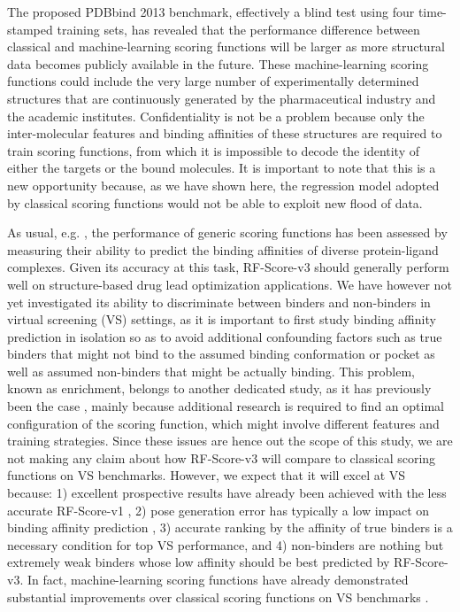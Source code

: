 The proposed PDBbind 2013 benchmark, effectively a blind test using four time-stamped training sets, has revealed that the performance difference between classical and machine-learning scoring functions will be larger as more structural data becomes publicly available in the future. These machine-learning scoring functions could include the very large number of experimentally determined structures that are continuously generated by the pharmaceutical industry and the academic institutes. Confidentiality is not be a problem because only the inter-molecular features and binding affinities of these structures are required to train scoring functions, from which it is impossible to decode the identity of either the targets or the bound molecules. It is important to note that this is a new opportunity because, as we have shown here, the regression model adopted by classical scoring functions would not be able to exploit new flood of data.

As usual, e.g. \citep{1313}, the performance of generic scoring functions has been assessed by measuring their ability to predict the binding affinities of diverse protein-ligand complexes. Given its accuracy at this task, RF-Score-v3 should generally perform well on structure-based drug lead optimization applications. We have however not yet investigated its ability to discriminate between binders and non-binders in virtual screening (VS) settings, as it is important to first study binding affinity prediction in isolation so as to avoid additional confounding factors such as true binders that might not bind to the assumed binding conformation or pocket as well as assumed non-binders that might be actually binding. This problem, known as enrichment, belongs to another dedicated study, as it has previously been the case \citep{977,1477}, mainly because additional research is required to find an optimal configuration of the scoring function, which might involve different features and training strategies. Since these issues are hence out the scope of this study, we are not making any claim about how RF-Score-v3 will compare to classical scoring functions on VS benchmarks. However, we expect that it will excel at VS because: 1) excellent prospective results have already been achieved with the less accurate RF-Score-v1 \citep{1281}, 2) pose generation error has typically a low impact on binding affinity prediction \citep{1362}, 3) accurate ranking by the affinity of true binders is a necessary condition for top VS performance, and 4) non-binders are nothing but extremely weak binders whose low affinity should be best predicted by RF-Score-v3. In fact, machine-learning scoring functions have already demonstrated substantial improvements over classical scoring functions on VS benchmarks \citep{1476}.


